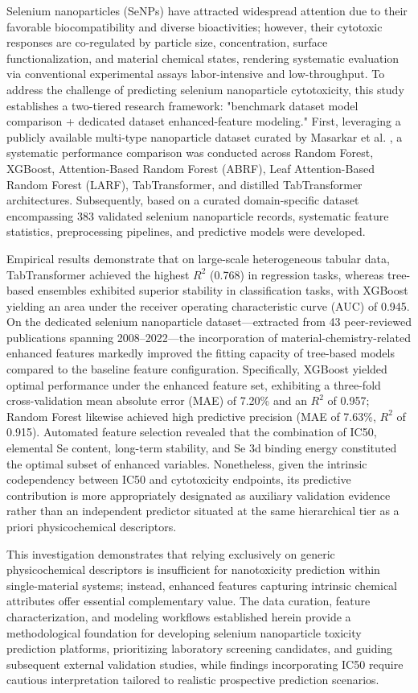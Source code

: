 Selenium nanoparticles (SeNPs) have attracted widespread attention due to their favorable biocompatibility and diverse bioactivities; however, their cytotoxic responses are co-regulated by particle size, concentration, surface functionalization, and material chemical states, rendering systematic evaluation via conventional experimental assays labor-intensive and low-throughput. To address the challenge of predicting selenium nanoparticle cytotoxicity, this study establishes a two-tiered research framework: "benchmark dataset model comparison + dedicated dataset enhanced-feature modeling." First, leveraging a publicly available multi-type nanoparticle dataset curated by Masarkar et al. \cite{masarkar2024}, a systematic performance comparison was conducted across Random Forest, XGBoost, Attention-Based Random Forest (ABRF), Leaf Attention-Based Random Forest (LARF), TabTransformer, and distilled TabTransformer architectures. Subsequently, based on a curated domain-specific dataset encompassing 383 validated selenium nanoparticle records, systematic feature statistics, preprocessing pipelines, and predictive models were developed.

Empirical results demonstrate that on large-scale heterogeneous tabular data, TabTransformer achieved the highest $R^2$ (0.768) in regression tasks, whereas tree-based ensembles exhibited superior stability in classification tasks, with XGBoost yielding an area under the receiver operating characteristic curve (AUC) of 0.945. On the dedicated selenium nanoparticle dataset—extracted from 43 peer-reviewed publications spanning 2008--2022—the incorporation of material-chemistry-related enhanced features markedly improved the fitting capacity of tree-based models compared to the baseline feature configuration. Specifically, XGBoost yielded optimal performance under the enhanced feature set, exhibiting a three-fold cross-validation mean absolute error (MAE) of 7.20\% and an $R^2$ of 0.957; Random Forest likewise achieved high predictive precision (MAE of 7.63\%, $R^2$ of 0.915). Automated feature selection revealed that the combination of IC50, elemental Se content, long-term stability, and Se 3d binding energy constituted the optimal subset of enhanced variables. Nonetheless, given the intrinsic codependency between IC50 and cytotoxicity endpoints, its predictive contribution is more appropriately designated as auxiliary validation evidence rather than an independent predictor situated at the same hierarchical tier as a priori physicochemical descriptors.

This investigation demonstrates that relying exclusively on generic physicochemical descriptors is insufficient for nanotoxicity prediction within single-material systems; instead, enhanced features capturing intrinsic chemical attributes offer essential complementary value. The data curation, feature characterization, and modeling workflows established herein provide a methodological foundation for developing selenium nanoparticle toxicity prediction platforms, prioritizing laboratory screening candidates, and guiding subsequent external validation studies, while findings incorporating IC50 require cautious interpretation tailored to realistic prospective prediction scenarios.
